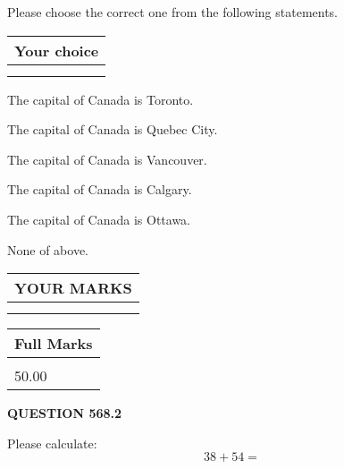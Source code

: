 \documentclass[12pt]{article}
\begin{document}
  
Please choose the correct one from the following statements.
  
  
\noindent\hspace{3.0in} \begin{tabular}{|l|}
\hline
Your choice \\
\hline
 \\ 
 \\ 
\hline
\end{tabular}
  
  
 
 
The capital of Canada is Toronto.
 
 
The capital of Canada is Quebec City.
 
 
The capital of Canada is Vancouver.
 
 
The capital of Canada is Calgary.
 
 
The capital of Canada is Ottawa.
 
 
 None of above.
 
 
  
\vspace{0.2in}
  
\noindent\begin{tabular}{|l|}
\hline
 YOUR MARKS  \\
\hline
 \\ 
 \\ 
\hline
\end{tabular}
\hspace{0.05in} \begin{tabular}{|l|}
\hline
 Full Marks  \\
\hline
 \\ 
50.00 \\
\hline
\end{tabular}
{\textbf{\Large{QUESTION
568.2 
}}}
  
  
 
Please calculate:
\begin{equation}
38 +  %
54 = \nonumber
\end{equation}
 

 

 
   
   
 \vspace{0.2in}
 
   
   
   
   
\end{document}
